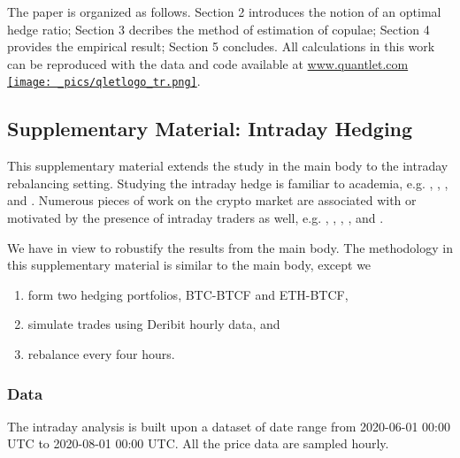 \documentclass[11pt,a4paper,english]{article}
\begin{document}
The paper is organized as follows. Section 2 introduces the notion of
an optimal hedge ratio; Section 3 decribes the method of estimation of
copulae; Section 4 provides the empirical result; Section 5
concludes. 
All calculations in this work can be reproduced with the data and code
available at \href{http://www.quantlet.com/}{www.quantlet.com
  {\texttt{[image: \_pics/qletlogo\_tr.png]}}}. 



%




\newpage
%


\subsection{Supplementary Material: Intraday Hedging}
This supplementary material extends the study in the main body to the intraday rebalancing setting. Studying the intraday hedge is familiar to academia,
e.g. \citet{harris2010limits}, \citet{dungey2013impact}, \citet{tse2013does}, and \citet{sheu2014incremental}.
Numerous pieces of work on the crypto market are associated with or motivated by the presence of intraday traders as well,
e.g. \citet{petukhina2021rise}, \citet{meshcheryakov2020ethereum}, \citet{alexander2022role}, \citet{zhang2022data}, and \citet{katsiampa2022high}.

We have in view to robustify the results from the main body.
The methodology in this supplementary material is similar to the main body, except we
\begin{enumerate}
\item form two hedging portfolios, BTC-BTCF and ETH-BTCF,
\item simulate trades using Deribit hourly data, and
\item rebalance every four hours.
\end{enumerate}

\subsubsection{Data}
The intraday analysis is built upon a dataset of date range from 2020-06-01 00:00 UTC to 2020-08-01 00:00 UTC.
All the price data are sampled hourly.
\end{document}
